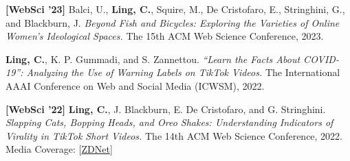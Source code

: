 \documentclass[12pt]{resume}
\begin{document}
\begin{etaremune}[leftmargin=.6in]
    \item \textbf{[WebSci '23]} Balci, U., \textbf{Ling, C.}, Squire, M., De Cristofaro, E., Stringhini, G., and Blackburn, J.
    \textit{Beyond Fish and Bicycles: Exploring the Varieties of Online Women's Ideological Spaces.} 
    \newline The 15th ACM Web Science Conference, 2023. 

    \item {} 
    \textbf{Ling, C.}, K. P. Gummadi, and S. Zannettou.
    \newline \textit{``Learn the Facts About COVID-19'': Analyzing the Use of Warning Labels on TikTok Videos.} 
    \newline The International AAAI Conference on Web and Social Media (ICWSM), 2022.
    
    \item \textbf{[WebSci '22]} 
    \textbf{Ling, C.}, J. Blackburn, E. De Cristofaro, and G. Stringhini. 
    \newline \textit{Slapping Cats, Bopping Heads, and Oreo Shakes: Understanding Indicators of Virality in TikTok Short Videos.} 
    \newline The 14th ACM Web Science Conference, 2022.
    \newline Media Coverage: [\href{https://www.zdnet.com/article/tiktok-doesnt-read-your-mind-it-makes-your-mind/}{ZDNet}]
\clearpage
      

\end{etaremune}
\end{document}
